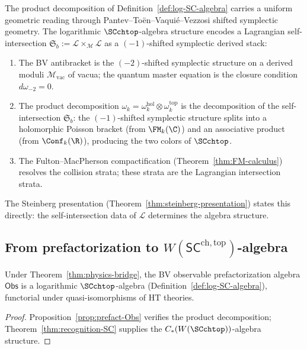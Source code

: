 \begin{remark}
\label{rem:lagrangian-geometry}
The product decomposition of Definition~\ref{def:log-SC-algebra} carries a
uniform geometric reading through Pantev--To\"en--Vaqui\'e--Vezzosi
shifted symplectic geometry. The logarithmic $\SCchtop$-algebra structure
encodes a Lagrangian self-intersection
$\mathfrak{S}_b := \mathcal{L} \times_{\mathcal{M}} \mathcal{L}$
as a $(-1)$-shifted symplectic derived stack:
\begin{enumerate}[label=\textup{(\roman*)}]
\item The BV antibracket is the $(-2)$-shifted symplectic
 structure on a derived moduli $\mathcal{M}_{\mathrm{vac}}$
 of vacua; the quantum master equation is the closure condition $d\omega_{-2}=0$.
\item The product decomposition $\omega_k = \omega_k^{\mathrm{hol}} \otimes \omega_k^{\mathrm{top}}$
 is the decomposition of the self-intersection $\mathfrak{S}_b$: the
 $(-1)$-shifted symplectic structure splits into a holomorphic Poisson bracket
 (from $\FM_k(\C)$) and an associative product (from $\Conf_k(\R)$),
 producing the two colors of $\SCchtop$.
\item The Fulton--MacPherson compactification (Theorem~\ref{thm:FM-calculus})
 resolves the collision strata; these strata are the Lagrangian intersection strata.
\end{enumerate}
The Steinberg presentation (Theorem~\ref{thm:steinberg-presentation})
states this directly: the self-intersection data of $\mathcal{L}$ determines the
algebra structure.
\end{remark}

\subsection{From prefactorization to $W(\mathsf{SC}^{\mathrm{ch,top}})$-algebra}
\label{subsec:from-prefact}
\begin{theorem}
\label{thm:Obs-is-SC}
Under Theorem~\ref{thm:physics-bridge}, the BV observable prefactorization algebra $\mathsf{Obs}$ is a logarithmic $\SCchtop$-algebra (Definition~\ref{def:log-SC-algebra}), functorial under quasi-isomorphisms of HT theories.
\end{theorem}

\begin{proof}
Proposition~\ref{prop:prefact-Obs} verifies the product decomposition; Theorem~\ref{thm:recognition-SC} supplies the $C_\ast(W(\SCchtop))$-algebra structure.
\end{proof}

